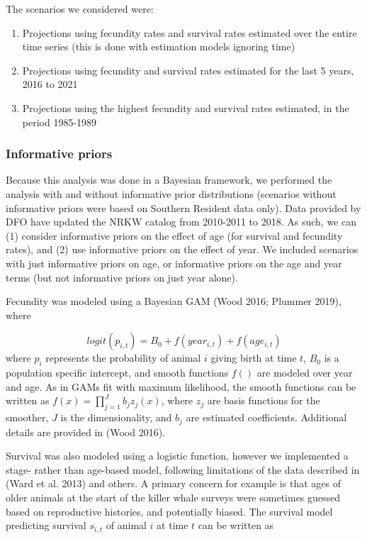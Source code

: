 \documentclass[]{article}
\providecommand{\tightlist}{%
  \setlength{\itemsep}{0pt}\setlength{\parskip}{0pt}}
\begin{document}
The scenarios we considered were:

\begin{enumerate}
\def\labelenumi{\arabic{enumi}.}
\tightlist
\item
  Projections using fecundity rates and survival rates estimated over
  the entire time series (this is done with estimation models ignoring
  time)\\
\item
  Projections using fecundity and survival rates estimated for the last
  5 years, 2016 to 2021\\
\item
  Projections using the highest fecundity and survival rates estimated,
  in the period 1985-1989
\end{enumerate}

\hypertarget{informative-priors}{%
\subsubsection{Informative priors}\label{informative-priors}}

Because this analysis was done in a Bayesian framework, we performed the
analysis with and without informative prior distributions (scenarios
without informative priors were based on Southern Resident data only).
Data provided by DFO have updated the NRKW catalog from 2010-2011 to
2018. As such, we can (1) consider informative priors on the effect of
age (for survival and fecundity rates), and (2) use informative priors
on the effect of year. We included scenarios with just informative
priors on age, or informative priors on the age and year terms (but not
informative priors on just year alone).

Fecundity was modeled using a Bayesian GAM (Wood 2016; Plummer 2019),
where

\[logit(p_{i,t})=B_{0} + f(year_{i,t}) + f(age_{i,t})\] where \(p_i\)
represents the probability of animal \(i\) giving birth at time \(t\),
\(B_{0}\) is a population specific intercept, and smooth functions
\(f()\) are modeled over year and age. As in GAMs fit with maximum
likelihood, the smooth functions can be written as
\(f(x)=\prod _{ j=1 }^{ J }{ { b }_{ j }{ z }_{ j }\left( x \right) }\),
where \(z_{j}\) are basis functions for the smoother, \(J\) is the
dimensionality, and \(b_{j}\) are estimated coefficients. Additional
details are provided in (Wood 2016).

Survival was also modeled using a logistic function, however we
implemented a stage- rather than age-based model, following limitations
of the data described in (Ward et al. 2013) and others. A primary
concern for example is that ages of older animals at the start of the
killer whale surveys were sometimes guessed based on reproductive
histories, and potentially biased. The survival model predicting
survival \(s_{i,t}\) of animal \(i\) at time \(t\) can be written as
\end{document}
